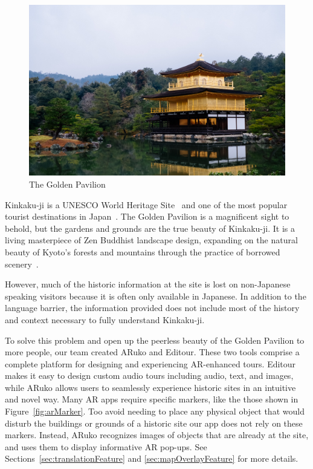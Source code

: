 \documentclass[a4paper, 10pt, american, titlepage]{article}
\begin{document}
\begin{figure}[h]
	\centering
	\includegraphics[width=\textwidth]{kinkakuji-1.jpg}
	\caption[The Golden Pavilion]{The Golden Pavilion~\autocite{fan2018}}
	\label{fig:kinkakuji1}
\end{figure}

Kinkaku-ji is a UNESCO World Heritage Site~\autocite{unesco} and one of the
most popular tourist destinations in Japan~\autocite{japanguide2019}. The
Golden Pavilion is a magnificent sight to behold, but the gardens and grounds
are the true beauty of Kinkaku-ji. It is a living masterpiece of Zen Buddhist
landscape design, expanding on the natural beauty of Kyoto's forests and
mountains through the practice of borrowed scenery~\autocite{kuitert2002}.

However, much of the historic information at the site is lost on non-Japanese
speaking visitors because it is often only available in Japanese. In addition to
the language barrier, the information provided does not include most of the
history and context necessary to fully understand Kinkaku-ji.

To solve this problem and open up the peerless beauty of the Golden Pavilion to
more people, our team created ARuko and Editour. These two tools comprise a
complete platform for designing and experiencing AR-enhanced tours. Editour
makes it easy to design custom audio tours including audio, text, and images,
while ARuko allows users to seamlessly experience historic sites in an intuitive
and novel way. Many AR apps require specific markers, like the those shown in
Figure~\ref{fig:arMarker}. Too avoid needing to place any physical object that
would disturb the buildings or grounds of a historic site our app does not rely
on these markers. Instead, ARuko recognizes images of objects that are already
at the site, and uses them to display informative AR pop-ups. See
Sections~\ref{sec:translationFeature} and \ref{sec:mapOverlayFeature} for more
details.
\end{document}
